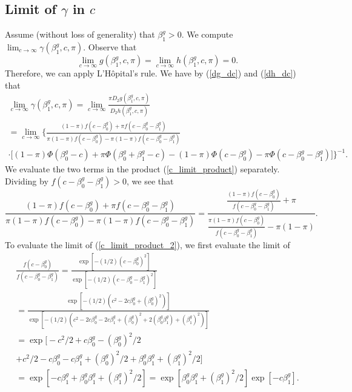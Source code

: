 \documentclass[12pt]{article}
\begin{document}
\begin{appendices}
\begin{refsection}
		\subsection{Limit of $\gamma$ in $c$}\label{sec:c_limit}
		
		Assume (without loss of generality) that $\beta^g_1 > 0$. We compute $\lim_{c \to \infty} \gamma(\beta^g_1, c, \pi)$. Observe that $$\lim_{c \to \infty} g(\beta^g_1, c, \pi) = \lim_{c \to \infty} h(\beta^g_1, c, \pi)  = 0.$$ Therefore, we can apply L'H\^{o}pital's rule. We have by (\ref{dg_dc}) and (\ref{dh_dc}) that \begin{multline}\label{c_limit_product}
		\lim_{c \to \infty} \gamma(\beta^g_1, c, \pi) = \lim_{c \to \infty} \frac{\pi D_2 g(\beta^g_1, c, \pi)}{D_2h(\beta^g_1, c, \pi)} \\ = \lim_{c \to \infty} \bigg\{ \frac{(1-\pi) f(c - \beta^g_0) + \pi f(c - \beta^g_0 - \beta^g_1)}{\pi (1-\pi) f(c - \beta^g_0) - \pi (1-\pi)f(c - \beta^g_0 - \beta^g_1)} \\ \cdot \bigg[ (1-\pi) \Phi(\beta_0^g - c) + \pi \Phi(\beta^g_0 + \beta^g_1 - c) - (1-\pi) \Phi(c - \beta^g_0) - \pi \Phi(c - \beta_0^g - \beta_1^g) \bigg] \bigg\}^{-1}.
		\end{multline}
		We evaluate the two terms in the product (\ref{c_limit_product}) separately. Dividing by $f(c - \beta^g_0 - \beta^g_1) > 0$, we see that
		\begin{equation}\label{c_limit_product_2}
		\frac{(1-\pi) f(c - \beta^g_0) + \pi f(c - \beta^g_0 - \beta^g_1)}{\pi (1-\pi) f(c - \beta^g_0) - \pi (1-\pi)f(c - \beta^g_0 - \beta^g_1)} = \frac{\frac{(1-\pi) f(c - \beta^g_0)}{ f(c - \beta^g_0 - \beta^g_1)} + \pi}{\frac{ \pi(1-\pi) f(c - \beta^g_0)}{ f(c - \beta^g_0 - \beta^g_1)} - \pi(1-\pi)}.
		\end{equation}
		To evaluate the limit of (\ref{c_limit_product_2}), we first evaluate the limit of
		\begin{multline}\label{c_limit_product_3}
		\frac{f(c - \beta^g_0)}{f(c - \beta^g_0 - \beta^g_1)} = \frac{\exp{[-(1/2)(c - \beta_0^g)^2]}}{\exp{[-(1/2)( c - \beta^g_0 - \beta^g_1)^2]}} \\ = \frac{\exp[ -(1/2)(c^2 - 2 c \beta^g_0 + (\beta^g_0)^2)]}{\exp\left[-(1/2)( c^2 - 2c \beta^g_0 - 2 c \beta^g_1 + (\beta^g_0)^2 + 2( \beta^g_0 \beta^g_1) + (\beta^g_1)^2)\right]} \\ = \exp\big[-c^2/2 + c \beta^g_0 - (\beta^g_0)^2/2 \\ + c^2/2 - c \beta^g_0 - c \beta^g_1 + (\beta^g_0)^2/2 + \beta^g_0 \beta^g_1 + (\beta^g_1)^2/2 \big] \\ = \exp[ -c \beta^g_1 + \beta^g_0 \beta^g_1 + (\beta^g_1)^2/2] = \exp[ \beta^g_0 \beta^g_1 + (\beta^g_1)^2/2]\exp[ -c \beta^g_1]. 

\end{multline}
\end{refsection}
\end{appendices}
\end{document}
